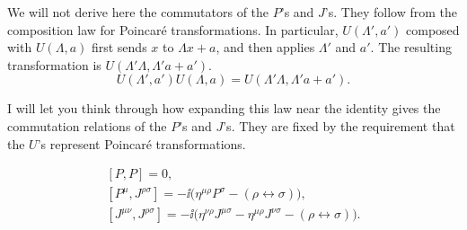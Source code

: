 We will not derive here
the commutators of the $P$'s and $J$'s. They follow from the composition law for
Poincaré transformations.
In particular, $U(\Lambda',a')$ composed with $U(\Lambda,a)$ first sends $x$ to
$\Lambda x+a$, and
then applies $\Lambda'$ and $a'$. The resulting transformation is
$U(\Lambda'\Lambda,\Lambda'a+a')$.
\begin{equation}
  U(\Lambda',a')U(\Lambda,a)
  =U(\Lambda'\Lambda,\Lambda'a+a').
  \label{eq:253a-poincare-composition}
\end{equation}

I will let you think through how expanding this law near the identity gives the
commutation relations of the $P$'s and $J$'s. They are fixed by the requirement
that the $U$'s represent Poincaré transformations.

\begin{equation}
  \begin{gathered}
    [P,P]=0,\\
    [P^\mu,J^{\rho\sigma}]
    =-\ii\bigl(\eta^{\mu\rho}P^\sigma-(\rho\leftrightarrow\sigma)\bigr),\\
    [J^{\mu\nu},J^{\rho\sigma}]
    =-\ii\bigl(\eta^{\nu\rho}J^{\mu\sigma}
              -\eta^{\mu\rho}J^{\nu\sigma}
              -(\rho\leftrightarrow\sigma)\bigr).
  \end{gathered}
  \label{eq:253a-poincare-algebra}
\end{equation}

